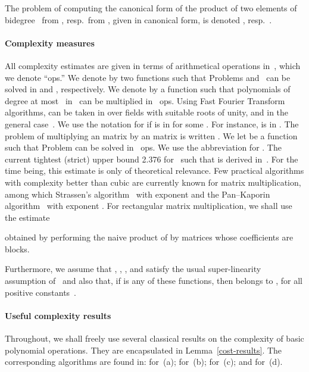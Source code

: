 \documentclass{sig-alt-full}
\begin{document}
The problem of computing the canonical form of the product of two elements of bidegree~ from , resp.\ from , given in canonical form, is denoted , resp.\ .


\paragraph*{Complexity measures}
All complexity estimates are given in terms of arithmetical operations in~, which we denote ``ops.''
We denote by  two functions such that Problems  and~ can be solved in  and , respectively.
We denote by  a function such that polynomials of degree at most~ in~ can be multiplied in ~ops.
Using Fast Fourier Transform algorithms,  can be taken in  over fields with suitable roots of unity, and  in the general case~\cite{ScSt71,CaKa91}. 
We use the notation  for  if  is in  for some .
For instance,  is in .
The problem of multiplying an  matrix by an  matrix is written . 
We let  be a function such that Problem   can be solved in ~ops.
We use the abbreviation  for .
The current tightest (strict) upper bound 2.376 for~ such that  is derived in~\cite{CoWi90}.
For the time being, this estimate is only of theoretical relevance.
Few practical algorithms with complexity better than cubic are currently known  for matrix multiplication, among which
Strassen's algorithm~\cite{Strassen69} with exponent  and the Pan--Kaporin algorithm~\cite{Kaporin04} with exponent .
For rectangular matrix multiplication,
we shall use the estimate

obtained by performing the naive product of  by  matrices whose coefficients are  blocks.

Furthermore, we assume that , ,  , and  satisfy the usual super-linearity assumption of~\cite[\S8.3, Eq.~(9)]{GaGe99} and also that, if  is any of these functions,  then  belongs to , for all positive constants~.





\paragraph*{Useful complexity results}
Throughout, we shall freely use several classical results on the complexity of basic polynomial operations.
They are encapsulated in Lemma~\ref{cost-results}.
The corresponding algorithms are found in: \cite[Algorithm~E]{GaGe97} for~(a); \cite[Chapter~10]{GaGe99} for~(b); \cite[Th.~2.4 and 2.5]{Gerhard00} for~(c); and \cite[Cor.~8.29]{GaGe99} for~(d).
\end{document}
